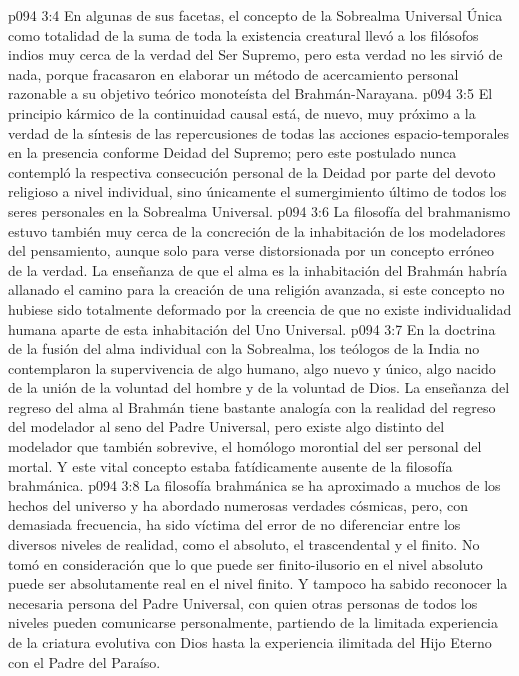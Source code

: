 \vs p094 3:4 En algunas de sus facetas, el concepto de la Sobrealma Universal Única como totalidad de la suma de toda la existencia creatural llevó a los filósofos indios muy cerca de la verdad del Ser Supremo, pero esta verdad no les sirvió de nada, porque fracasaron en elaborar un método de acercamiento personal razonable a su objetivo teórico monoteísta del Brahmán\hyp{}Narayana.
\vs p094 3:5 El principio kármico de la continuidad causal está, de nuevo, muy próximo a la verdad de la síntesis de las repercusiones de todas las acciones espacio\hyp{}temporales en la presencia conforme Deidad del Supremo; pero este postulado nunca contempló la respectiva consecución personal de la Deidad por parte del devoto religioso a nivel individual, sino únicamente el sumergimiento último de todos los seres personales en la Sobrealma Universal.
\vs p094 3:6 La filosofía del brahmanismo estuvo también muy cerca de la concreción de la inhabitación de los modeladores del pensamiento, aunque solo para verse distorsionada por un concepto erróneo de la verdad. La enseñanza de que el alma es la inhabitación del Brahmán habría allanado el camino para la creación de una religión avanzada, si este concepto no hubiese sido totalmente deformado por la creencia de que no existe individualidad humana aparte de esta inhabitación del Uno Universal.
\vs p094 3:7 En la doctrina de la fusión del alma individual con la Sobrealma, los teólogos de la India no contemplaron la supervivencia de algo humano, algo nuevo y único, algo nacido de la unión de la voluntad del hombre y de la voluntad de Dios. La enseñanza del regreso del alma al Brahmán tiene bastante analogía con la realidad del regreso del modelador al seno del Padre Universal, pero existe algo distinto del modelador que también sobrevive, el homólogo morontial del ser personal del mortal. Y este vital concepto estaba fatídicamente ausente de la filosofía brahmánica.
\vs p094 3:8 La filosofía brahmánica se ha aproximado a muchos de los hechos del universo y ha abordado numerosas verdades cósmicas, pero, con demasiada frecuencia, ha sido víctima del error de no diferenciar entre los diversos niveles de realidad, como el absoluto, el trascendental y el finito. No tomó en consideración que lo que puede ser finito\hyp{}ilusorio en el nivel absoluto puede ser absolutamente real en el nivel finito. Y tampoco ha sabido reconocer la necesaria persona del Padre Universal, con quien otras personas de todos los niveles pueden comunicarse personalmente, partiendo de la limitada experiencia de la criatura evolutiva con Dios hasta la experiencia ilimitada del Hijo Eterno con el Padre del Paraíso.
